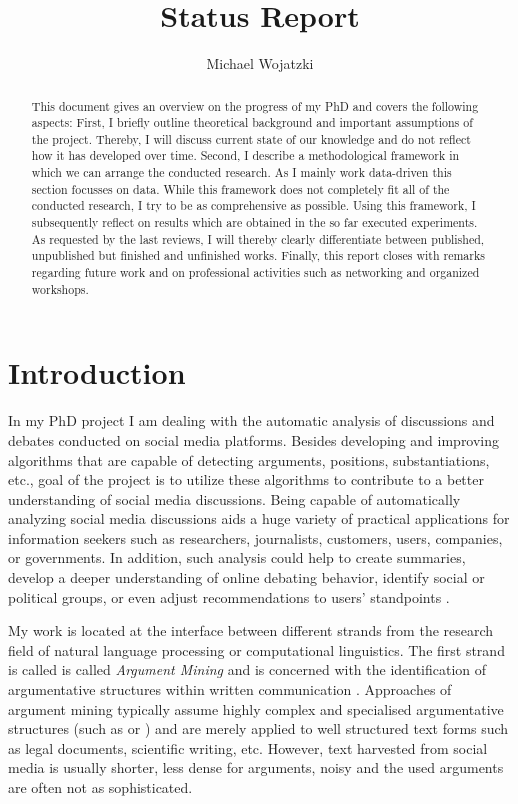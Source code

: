 \documentclass[11pt]{article}
\title{Status Report}
\author{Michael Wojatzki}
\date{}
\begin{document}
\maketitle
\begin{abstract}
This document gives an overview on the progress of my PhD and covers the following aspects:
First, I briefly outline theoretical background and important assumptions of the project. 
Thereby, I will discuss current state of our knowledge and do not reflect how it has developed over time.
Second, I describe a methodological framework in which we can arrange the conducted research.
As I mainly work data-driven this section focusses on data.
While this framework does not completely fit all of the conducted research, I try to be as comprehensive as possible.
Using this framework, I subsequently reflect on results which are obtained in the so far executed experiments.
As requested by the last reviews, I will thereby clearly differentiate between published, unpublished but finished and unfinished works. 
Finally, this report closes with remarks regarding future work and on professional activities such as networking and organized workshops.

\end{abstract}

\section{Introduction}

In my PhD project I am dealing with the automatic analysis of discussions and debates conducted on social media platforms.
Besides developing and improving algorithms that are capable of detecting arguments, positions, substantiations, etc., goal of the project is to utilize these algorithms to contribute to a better understanding of social media discussions.
Being capable of automatically analyzing social media discussions aids a huge variety of practical applications for information seekers such as researchers, journalists, customers, users, companies, or governments.
In addition, such analysis could help to create summaries, develop a deeper understanding of online debating behavior, identify social or political groups, or even adjust recommendations to users' standpoints \cite{anand2011cats,sridhar2014collective,boltuzic2014back}.

My work is located at the interface between different strands from the research field of natural language processing or computational linguistics.
The first strand is called is called \textit{Argument Mining} and is concerned with the identification of argumentative structures within written communication \cite{green2014argmining}.
Approaches of argument mining typically assume highly complex and specialised argumentative structures (such as  or ) and are merely applied to well structured text forms such as legal documents, scientific writing, etc.
However, text harvested from social media is usually shorter, less dense for arguments, noisy and the used arguments are often not as sophisticated.
\end{document}
